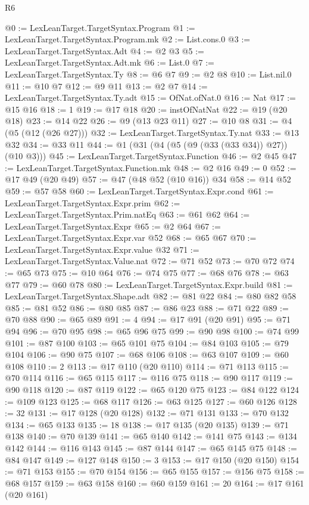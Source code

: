 \begin{lexlean}{R6}
\begin{coremodule}
@0 := LexLeanTarget.TargetSyntax.Program
@1 := LexLeanTarget.TargetSyntax.Program.mk
@2 := List.cons.{0}
@3 := LexLeanTarget.TargetSyntax.Adt
@4 := @2 @3
@5 := LexLeanTarget.TargetSyntax.Adt.mk
@6 := List.{0}
@7 := LexLeanTarget.TargetSyntax.Ty
@8 := @6 @7
@9 := @2 @8
@10 := List.nil.{0}
@11 := @10 @7
@12 := @9 @11
@13 := @2 @7
@14 := LexLeanTarget.TargetSyntax.Ty.adt
@15 := OfNat.ofNat.{0}
@16 := Nat
@17 := @15 @16
@18 := 1
@19 := @17 @18
@20 := instOfNatNat
@22 := @19 (@20 @18)
@23 := @14 @22
@26 := @9 (@13 @23 @11)
@27 := @10 @8
@31 := @4 (@5 (@12 (@26 @27)))
@32 := LexLeanTarget.TargetSyntax.Ty.nat
@33 := @13 @32
@34 := @33 @11
@44 := @1 (@31 (@4 (@5 (@9 (@33 (@33 @34)) @27)) (@10 @3)))
@45 := LexLeanTarget.TargetSyntax.Function
@46 := @2 @45
@47 := LexLeanTarget.TargetSyntax.Function.mk
@48 := @2 @16
@49 := 0
@52 := @17 @49 (@20 @49)
@57 := @47 (@48 @52 (@10 @16)) @34
@58 := @14 @52
@59 := @57 @58
@60 := LexLeanTarget.TargetSyntax.Expr.cond
@61 := LexLeanTarget.TargetSyntax.Expr.prim
@62 := LexLeanTarget.TargetSyntax.Prim.natEq
@63 := @61 @62
@64 := LexLeanTarget.TargetSyntax.Expr
@65 := @2 @64
@67 := LexLeanTarget.TargetSyntax.Expr.var @52
@68 := @65 @67
@70 := LexLeanTarget.TargetSyntax.Expr.value @32
@71 := LexLeanTarget.TargetSyntax.Value.nat
@72 := @71 @52
@73 := @70 @72
@74 := @65 @73
@75 := @10 @64
@76 := @74 @75
@77 := @68 @76
@78 := @63 @77
@79 := @60 @78
@80 := LexLeanTarget.TargetSyntax.Expr.build
@81 := LexLeanTarget.TargetSyntax.Shape.adt
@82 := @81 @22
@84 := @80 @82 @58
@85 := @81 @52
@86 := @80 @85
@87 := @86 @23
@88 := @71 @22
@89 := @70 @88
@90 := @65 @89
@91 := 4
@94 := @17 @91 (@20 @91)
@95 := @71 @94
@96 := @70 @95
@98 := @65 @96 @75
@99 := @90 @98
@100 := @74 @99
@101 := @87 @100
@103 := @65 @101 @75
@104 := @84 @103
@105 := @79 @104
@106 := @90 @75
@107 := @68 @106
@108 := @63 @107
@109 := @60 @108
@110 := 2
@113 := @17 @110 (@20 @110)
@114 := @71 @113
@115 := @70 @114
@116 := @65 @115
@117 := @116 @75
@118 := @90 @117
@119 := @90 @118
@120 := @87 @119
@122 := @65 @120 @75
@123 := @84 @122
@124 := @109 @123
@125 := @68 @117
@126 := @63 @125
@127 := @60 @126
@128 := 32
@131 := @17 @128 (@20 @128)
@132 := @71 @131
@133 := @70 @132
@134 := @65 @133
@135 := 18
@138 := @17 @135 (@20 @135)
@139 := @71 @138
@140 := @70 @139
@141 := @65 @140
@142 := @141 @75
@143 := @134 @142
@144 := @116 @143
@145 := @87 @144
@147 := @65 @145 @75
@148 := @84 @147
@149 := @127 @148
@150 := 3
@153 := @17 @150 (@20 @150)
@154 := @71 @153
@155 := @70 @154
@156 := @65 @155
@157 := @156 @75
@158 := @68 @157
@159 := @63 @158
@160 := @60 @159
@161 := 20
@164 := @17 @161 (@20 @161)

\end{coremodule}
\end{lexlean}
